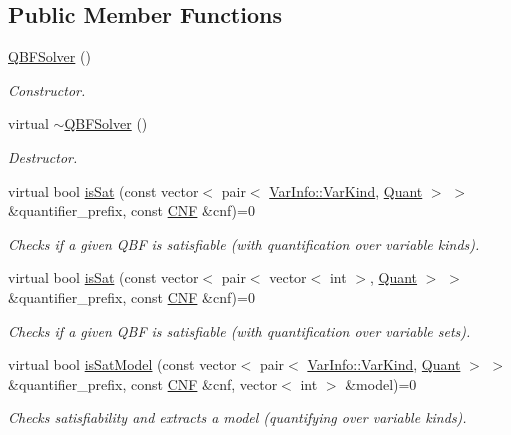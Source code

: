 \subsection*{Public Member Functions}
\begin{DoxyCompactItemize}
\item 
\hyperlink{classQBFSolver_ab5a0b6c6cdcbb64a93a9d3dee844ddd3}{Q\-B\-F\-Solver} ()
\begin{DoxyCompactList}\small\item\em Constructor. \end{DoxyCompactList}\item 
virtual \hyperlink{classQBFSolver_a46d8bcb3b6ba6299eea0ae21973d7049}{$\sim$\-Q\-B\-F\-Solver} ()
\begin{DoxyCompactList}\small\item\em Destructor. \end{DoxyCompactList}\item 
virtual bool \hyperlink{classQBFSolver_a53ef157391b176dfbd2a77a1e31befc3}{is\-Sat} (const vector$<$ pair$<$ \hyperlink{classVarInfo_a64d1da76cf84fe674e5fef9764ef11cf}{Var\-Info\-::\-Var\-Kind}, \hyperlink{classQBFSolver_ac091e263cb55286cc07b2451bcf4d3c7}{Quant} $>$ $>$ \&quantifier\-\_\-prefix, const \hyperlink{classCNF}{C\-N\-F} \&cnf)=0
\begin{DoxyCompactList}\small\item\em Checks if a given Q\-B\-F is satisfiable (with quantification over variable kinds). \end{DoxyCompactList}\item 
virtual bool \hyperlink{classQBFSolver_aca37de5801e36d4749b80b6c8c2023a9}{is\-Sat} (const vector$<$ pair$<$ vector$<$ int $>$, \hyperlink{classQBFSolver_ac091e263cb55286cc07b2451bcf4d3c7}{Quant} $>$ $>$ \&quantifier\-\_\-prefix, const \hyperlink{classCNF}{C\-N\-F} \&cnf)=0
\begin{DoxyCompactList}\small\item\em Checks if a given Q\-B\-F is satisfiable (with quantification over variable sets). \end{DoxyCompactList}\item 
virtual bool \hyperlink{classQBFSolver_a76fc0c757a2c039816e3e06547f06d5c}{is\-Sat\-Model} (const vector$<$ pair$<$ \hyperlink{classVarInfo_a64d1da76cf84fe674e5fef9764ef11cf}{Var\-Info\-::\-Var\-Kind}, \hyperlink{classQBFSolver_ac091e263cb55286cc07b2451bcf4d3c7}{Quant} $>$ $>$ \&quantifier\-\_\-prefix, const \hyperlink{classCNF}{C\-N\-F} \&cnf, vector$<$ int $>$ \&model)=0
\begin{DoxyCompactList}\small\item\em Checks satisfiability and extracts a model (quantifying over variable kinds). \end{DoxyCompactList}\item 

\end{DoxyCompactItemize}

